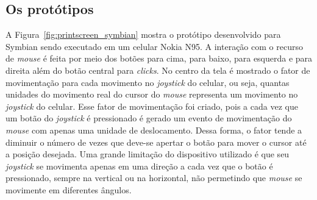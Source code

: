 \subsection{Os protótipos}

A Figura~\ref{fig:printscreen_symbian} mostra o protótipo desenvolvido para Symbian sendo executado em um celular Nokia N95. A interação com o recurso de \emph{mouse} é feita por meio dos botões para cima, para baixo, para esquerda e para direita além do botão central para \emph{clicks}. No centro da tela é mostrado o fator de movimentação para cada movimento no \emph{joystick} do celular, ou seja, quantas unidades do movimento real do cursor do \emph{mouse} representa um movimento no \emph{joystick} do celular. Esse fator de movimentação foi criado, pois a cada vez que um botão do \emph{joystick} é pressionado é gerado um evento de movimentação do \emph{mouse} com apenas uma unidade de deslocamento. Dessa forma, o fator tende a diminuir o número de vezes que deve-se apertar o botão para mover o cursor até a posição desejada. Uma grande limitação do dispositivo utilizado é que seu \emph{joystick} se movimenta apenas em uma direção a cada vez que o botão é pressionado, sempre na vertical ou na horizontal, não permetindo que \emph{mouse} se movimente em diferentes ângulos.

